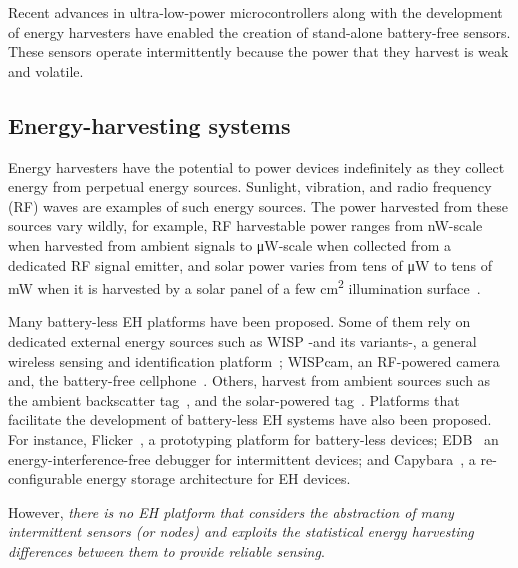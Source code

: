 Recent advances in ultra-low-power microcontrollers along with the development of energy harvesters have enabled the creation of stand-alone battery-free sensors. These sensors operate intermittently because the power that they harvest is
weak and volatile.

\subsection{Energy-harvesting systems}
Energy harvesters have the potential to power devices indefinitely as they collect energy from perpetual energy sources. Sunlight, vibration, and radio frequency (RF) waves are examples of such energy sources. The power harvested from these sources vary wildly, for example, RF harvestable power ranges from
\si{\nano\watt}-scale when harvested from ambient signals to \si{\uW}-scale when collected from a dedicated RF signal emitter, and solar power varies from tens of \si{\uW} to tens of \si{\mW} when it is harvested by a solar panel of a few \si{\cm^2} illumination surface~\cite{lucia2017intermittent,rao2017ambient}.

Many battery-less EH platforms have been proposed. Some of them
rely on dedicated external energy sources such as WISP -and its variants-, a
general wireless sensing and identification
platform~\cite{smith2006wirelessly,zhao2015nfc,zhang2011moo}; WISPcam,  an
RF-powered camera~\cite{naderiparizi2015wispcam} and, the battery-free
cellphone~\cite{talla2017battery}. Others, harvest from ambient sources such as
the ambient backscatter tag~\cite{liu2013ambient}, and the solar-powered
tag~\cite{majid2019multi}. Platforms that facilitate the development of
battery-less EH systems have also been proposed. For instance,
Flicker~\cite{hester2017flicker}, a prototyping platform for battery-less devices; EDB~\cite{colin2016energy} an energy-interference-free debugger for intermittent devices;  and Capybara~\cite{colin2018reconfigurable}, a re-configurable energy storage architecture for EH devices.

However, \emph{there is no EH platform that considers the abstraction of many intermittent sensors (or nodes) and exploits the statistical energy harvesting differences between them to provide reliable sensing}.


